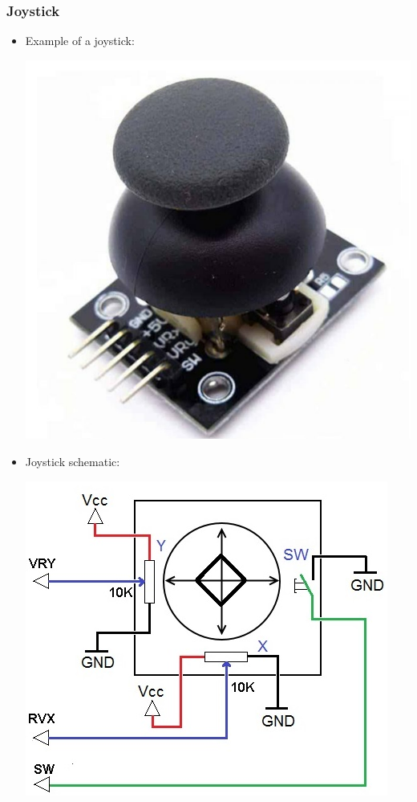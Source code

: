 \documentclass[12pt]{article}
\begin{document}
        \subsubsection{Joystick}
            \begin{itemize}
                \item Example of a joystick:
                \begin{center}
                    \includegraphics[scale = 0.25]{./images/joystick.png}
                \end{center}

                \item Joystick schematic:
                \begin{center}
                    \includegraphics[scale = 0.75]{./images/joystick_schematic.jpg}
                \end{center}


\end{itemize}
\end{document}
